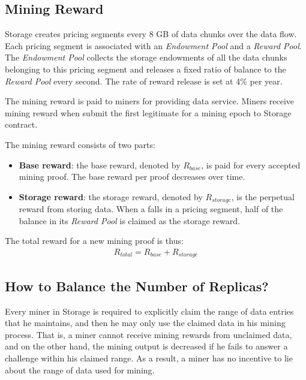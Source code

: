 

\subsection{Mining Reward}
\label{subsec:mining reward}

\projabbrev Storage creates pricing segments every 8 GB of data chunks over the data flow. 
%
Each pricing segment is associated with an \emph{Endowment Pool} and a \emph{Reward Pool}. 
%
The \emph{Endowment Pool} collects the storage endowments of all the data chunks belonging to this pricing segment and releases a fixed ratio of balance to the \emph{Reward Pool} every second. 
%
The rate of reward release is set at 4\% per year. 


The mining reward is paid to miners for providing data service.
Miners receive mining reward when submit the first legitimate {\sproof} for a mining epoch to \projabbrev Storage contract.

The mining reward consists of two parts:
\begin{itemize}
	\item {\bf Base reward}: the base reward, denoted by $R_{base}$, is paid for every accepted mining proof. The base reward per proof decreases over time.

	\item {\bf Storage reward}:  the storage reward, denoted by $R_{storage}$, is the perpetual reward from storing data. 
	When a {\sproof} falls in a pricing segment, half of the balance in its \emph{Reward Pool} is claimed as the storage reward. 

\end{itemize}

The total reward for a new mining proof is thus:
\begin{align}
	R_{total} = R_{base} + R_{storage}
\end{align}


\subsection{How to Balance the Number of Replicas?}

Every miner in \projabbrev Storage is required to explicitly claim the range of data entries that he maintains, 
and then he may only use the claimed data in his mining process.
That is, a miner cannot receive mining rewards from unclaimed data, and on the other hand, the mining output is decreased if he fails to answer a challenge within his claimed range.
As a result, a miner has no incentive to lie about the range of data used for mining.

